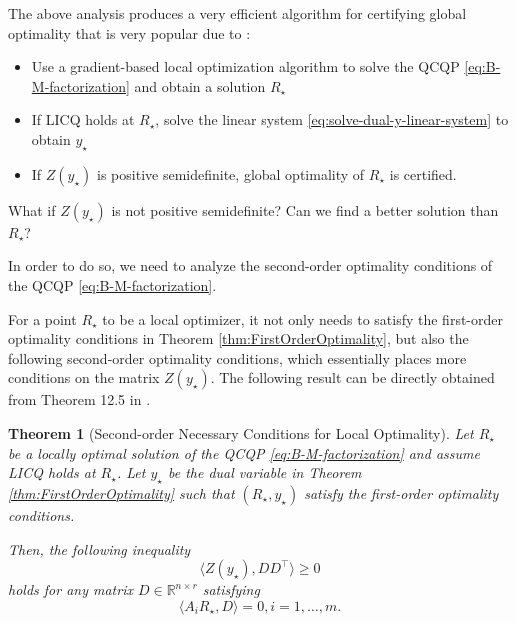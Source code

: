 \documentclass[
]{book}
\newtheorem{theorem}{Theorem}[chapter]
\theoremstyle{definition}
\theoremstyle{definition}
\theoremstyle{definition}
\theoremstyle{definition}
\theoremstyle{remark}
\begin{document}
The above analysis produces a very efficient algorithm for certifying global optimality that is very popular due to \citep{rosen19ijrr-sesync}:

\begin{itemize}
\item
  Use a gradient-based local optimization algorithm to solve the QCQP \eqref{eq:B-M-factorization} and obtain a solution \(R_\star\)
\item
  If LICQ holds at \(R_\star\), solve the linear system \eqref{eq:solve-dual-y-linear-system} to obtain \(y_\star\)
\item
  If \(Z(y_\star)\) is positive semidefinite, global optimality of \(R_\star\) is certified.
\end{itemize}

What if \(Z(y_\star)\) is not positive semidefinite? Can we find a better solution than \(R_\star\)?

In order to do so, we need to analyze the second-order optimality conditions of the QCQP \eqref{eq:B-M-factorization}.

For a point \(R_\star\) to be a local optimizer, it not only needs to satisfy the first-order optimality conditions in Theorem \ref{thm:FirstOrderOptimality}, but also the following second-order optimality conditions, which essentially places more conditions on the matrix \(Z(y_\star)\). The following result can be directly obtained from Theorem 12.5 in \citep{nocedal99book-numerical}.

\begin{theorem}[Second-order Necessary Conditions for Local Optimality]
\protect\hypertarget{thm:SecondOrderOptimalityConditions}{}\label{thm:SecondOrderOptimalityConditions}Let \(R_\star\) be a locally optimal solution of the QCQP \eqref{eq:B-M-factorization} and assume LICQ holds at \(R_\star\). Let \(y_\star\) be the dual variable in Theorem \ref{thm:FirstOrderOptimality} such that \((R_\star,y_\star)\) satisfy the first-order optimality conditions.

Then, the following inequality
\begin{equation}
\langle Z(y_\star), DD^\top \rangle \geq 0
\label{eq:non-decreasing-cost}
\end{equation}
holds for any matrix \(D \in \mathbb{R}^{n \times r}\) satisfying
\begin{equation}
\langle A_i R_\star , D \rangle = 0, i=1,\dots,m.
\label{eq:feasible-direction}
\end{equation}
\end{theorem}
\end{document}
